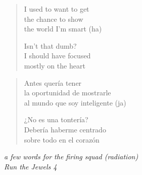 \clearpage\thispagestyle{empty}\vspace*{\fill}

\begin{verse}
I used to want to get \\
the chance to show \\
the world I'm smart (ha)

Isn't that dumb? \\
I should have focused \\
mostly on the heart
\end{verse}
\begin{verse}\small
Antes quería tener \\
la oportunidad de mostrarle \\
al mundo que soy inteligente (ja)

¿No es una tontería? \\
Debería haberme centrado \\
sobre todo en el corazón
\end{verse}
\begin{flushright}\small\itshape
a few words for the firing squad (radiation) \\
Run the Jewels 4
\end{flushright}

\vspace*{\fill}\clearpage
